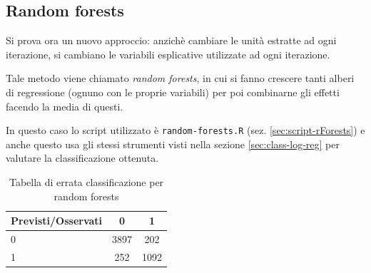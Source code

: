 
\subsection{Random forests}\label{sec:class-forests}

Si prova ora un nuovo approccio: anzichè cambiare le unità estratte ad ogni
iterazione, si cambiano le variabili esplicative utilizzate ad ogni iterazione.

Tale metodo viene chiamato \emph{random forests}, in cui si fanno crescere
tanti alberi di regressione (ognuno con le proprie variabili) per poi
combinarne gli effetti facendo la media di questi.

In questo caso lo script utilizzato è \texttt{random-forests.R} (sez.
\ref{sec:script-rForests}) e anche questo usa gli stessi strumenti visti nella
sezione \ref{sec:class-log-reg} per valutare la classificazione ottenuta.

\begin{table}[H]
\begin{center}
\begin{tabular}{ | l || c | c | }
  \hline
    Previsti/Osservati & 0 & 1 \\ \hline \hline
    0 & 3897 & 202 \\ \hline
    1 & 252 & 1092 \\ \hline
\end{tabular}
  \caption{Tabella di errata classificazione per random forests}
\end{center}
\end{table}

